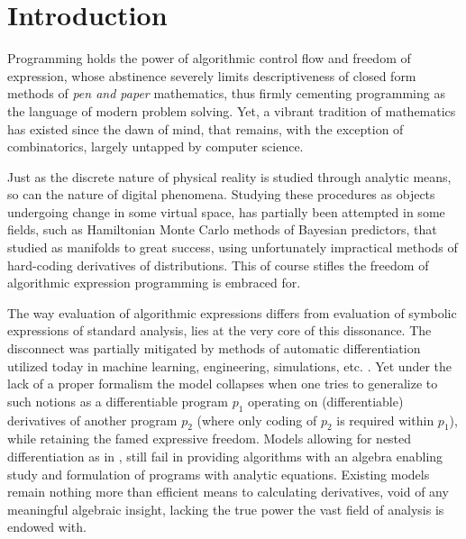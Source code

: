 \documentclass[11pt]{article}
\begin{document}
\section{Introduction}

Programming holds the power of algorithmic control flow and freedom of expression, whose abstinence severely limits descriptiveness of closed form methods of \textit{pen and paper} mathematics, thus firmly cementing programming as the language of modern problem solving. Yet, a vibrant tradition of mathematics has existed since the dawn of mind, that remains, with the exception of combinatorics, largely untapped by computer science. 

Just as the discrete nature of physical reality is studied through analytic means, so can the nature of digital phenomena. Studying these procedures as objects undergoing change in some virtual space, has partially been attempted in some fields, such as Hamiltonian Monte Carlo methods of Bayesian predictors, that \cite{StatMC} studied as manifolds to great success, using unfortunately impractical methods of hard-coding derivatives of distributions. This of course stifles the freedom of algorithmic expression programming is embraced for.

The way evaluation of algorithmic expressions differs from evaluation of
symbolic expressions of standard analysis, lies at the very core of this
dissonance. The disconnect was partially mitigated by methods of automatic
differentiation utilized today in machine learning, engineering,
simulations, etc. \citep[see][]{AdSurvey}. Yet under the lack of a proper formalism the model collapses \citep[see][]{AD2} when one tries to generalize to such notions as a differentiable program $p_1$ operating on (differentiable) derivatives of another program $p_2$ (where only coding of $p_2$ is required within $p_1$), while retaining the famed expressive freedom. 
Models allowing for nested differentiation as in \cite{AD1}, still fail in providing algorithms with an algebra enabling study and formulation of programs with analytic equations. Existing models remain nothing more than efficient means to calculating derivatives, void of any meaningful algebraic insight, lacking the true power the vast field of analysis is endowed with.
\end{document}
